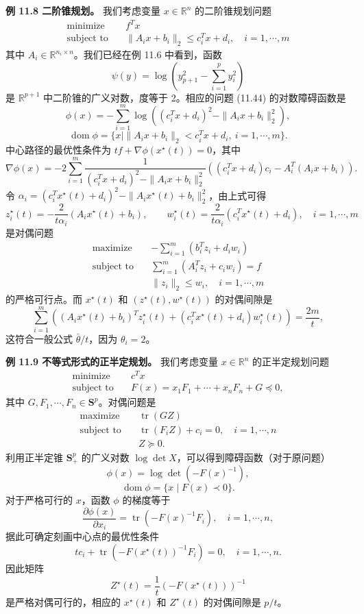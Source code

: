 \documentclass[UTF8, 12pt, fontset=fandol, oneside]{ctexart}
\begin{document}
\noindent\textbf{例 11.8 二阶锥规划。} 我们考虑变量 $x\in\mathbb{R}^n$ 的二阶锥规划问题
\begin{equation}
\begin{aligned}
\text{minimize}\quad & f^Tx\\
\text{subject to}\quad & \|A_ix+b_i\|_2\leq c_i^Tx+d_i,\quad i=1,\cdots,m
\end{aligned}
\tag{11.44}
\end{equation}
其中 $A_i\in\mathbb{R}^{n_i\times n}$。我们已经在例 11.6 中看到，函数
\[
\psi(y)=\log\left(y_{p+1}^2-\sum_{i=1}^p y_i^2\right)
\]
是 $\mathbb{R}^{p+1}$ 中二阶锥的广义对数，度等于 2。相应的问题 (11.44) 的对数障碍函数是
\begin{equation}
\phi(x)=-\sum_{i=1}^m\log\left((c_i^Tx+d_i)^2-\|A_ix+b_i\|_2^2\right),
\tag{11.45}
\end{equation}
\[
\operatorname{dom}\phi=\{x\mid \|A_ix+b_i\|_2<c_i^Tx+d_i,\ i=1,\cdots,m\}.
\]
中心路径的最优性条件为 $tf+\nabla\phi(x^\star(t))=0$，其中
\[
\nabla\phi(x)=-2\sum_{i=1}^m
\frac{1}{(c_i^Tx+d_i)^2-\|A_ix+b_i\|_2^2}
\left((c_i^Tx+d_i)c_i-A_i^T(A_ix+b_i)\right).
\]
令 $\alpha_i=(c_i^Tx^\star(t)+d_i)^2-\|A_ix^\star(t)+b_i\|_2^2$，由上式可得
\[
z_i^\star(t)=-\frac{2}{t\alpha_i}(A_ix^\star(t)+b_i),\qquad
w_i^\star(t)=\frac{2}{t\alpha_i}(c_i^Tx^\star(t)+d_i),\quad i=1,\cdots,m
\]
是对偶问题
\[
\begin{aligned}
\text{maximize}\quad & -\sum_{i=1}^m(b_i^Tz_i+d_iw_i)\\
\text{subject to}\quad & \sum_{i=1}^m(A_i^Tz_i+c_iw_i)=f\\
& \|z_i\|_2\leq w_i,\quad i=1,\cdots,m
\end{aligned}
\]
的严格可行点。而 $x^\star(t)$ 和 $(z^\star(t),w^\star(t))$ 的对偶间隙是
\[
\sum_{i=1}^m\left((A_ix^\star(t)+b_i)^Tz_i^\star(t)+(c_i^Tx^\star(t)+d_i)w_i^\star(t)\right)=\frac{2m}{t},
\]
这符合一般公式 $\bar{\theta}/t$，因为 $\theta_i=2$。

\noindent\textbf{例 11.9 不等式形式的正半定规划。} 我们考虑变量 $x\in\mathbb{R}^n$ 的正半定规划问题
\[
\begin{aligned}
\text{minimize}\quad & c^Tx\\
\text{subject to}\quad & F(x)=x_1F_1+\cdots+x_nF_n+G\preceq 0,
\end{aligned}
\]
其中 $G,F_1,\cdots,F_n\in\mathbf{S}^p$。对偶问题是
\[
\begin{aligned}
\text{maximize}\quad & \operatorname{tr}(GZ)\\
\text{subject to}\quad & \operatorname{tr}(F_iZ)+c_i=0,\quad i=1,\cdots,n\\
& Z\succeq 0.
\end{aligned}
\]
利用正半定锥 $\mathbf{S}_+^p$ 的广义对数 $\log\det X$，可以得到障碍函数（对于原问题）
\[
\phi(x)=\log\det(-F(x)^{-1}),
\]
\[
\operatorname{dom}\phi=\{x\mid F(x)\prec 0\}.
\]
对于严格可行的 $x$，函数 $\phi$ 的梯度等于
\[
\frac{\partial\phi(x)}{\partial x_i}=\operatorname{tr}(-F(x)^{-1}F_i),\quad i=1,\cdots,n,
\]
据此可确定刻画中心点的最优性条件
\[
tc_i+\operatorname{tr}(-F(x^\star(t))^{-1}F_i)=0,\quad i=1,\cdots,n.
\]
因此矩阵
\[
Z^\star(t)=\frac{1}{t}(-F(x^\star(t)))^{-1}
\]
是严格对偶可行的，相应的 $x^\star(t)$ 和 $Z^\star(t)$ 的对偶间隙是 $p/t$。
\end{document}
